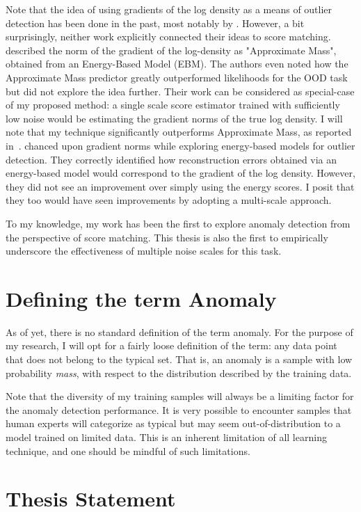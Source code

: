 Note that the idea of using gradients of the log density as a means of outlier detection has been done in the past, most notably by \cite{Grathwohl2020Your, pmlr-v48-zhai16}. However, a bit surprisingly, neither work explicitly connected their ideas to score matching. \cite{Grathwohl2020Your} described the norm of the gradient of the log-density as "Approximate Mass", obtained from an Energy-Based Model (EBM). The authors even noted how the Approximate Mass predictor greatly outperformed likelihoods for the OOD task but did not explore the idea further. Their work can be considered as special-case of my proposed method: a single scale score estimator trained with sufficiently low noise would be estimating the gradient norms of the true log density. I will note that my technique significantly outperforms Approximate Mass, as reported in~\cite{mahmood2021multiscale}. \cite{pmlr-v48-zhai16} chanced upon gradient norms while exploring energy-based models for outlier detection. They correctly identified how reconstruction errors obtained via an energy-based model would correspond to the gradient of the log density. However, they did not see an improvement over simply using the energy scores. I posit that they too would have seen improvements by adopting a multi-scale approach. 

To my knowledge, my work has been the first to explore anomaly detection from the perspective of score matching. This thesis is also the first to empirically underscore the effectiveness of multiple noise scales for this task.


\section{Defining the term Anomaly}
As of yet, there is no standard definition of the term anomaly. 
For the purpose of my research, I will opt for a fairly loose definition of the term: any data point that does not belong to the typical set. That is, an anomaly is a sample with low probability \textit{mass}, with respect to the distribution described by the training data. 

Note that the diversity of my training samples will always be a limiting factor for the anomaly detection performance. It is very possible to encounter samples that human experts will categorize as typical but may seem out-of-distribution to a model trained on limited data. This is an inherent limitation of all learning technique, and one should be mindful of such limitations.

\section{Thesis Statement}

